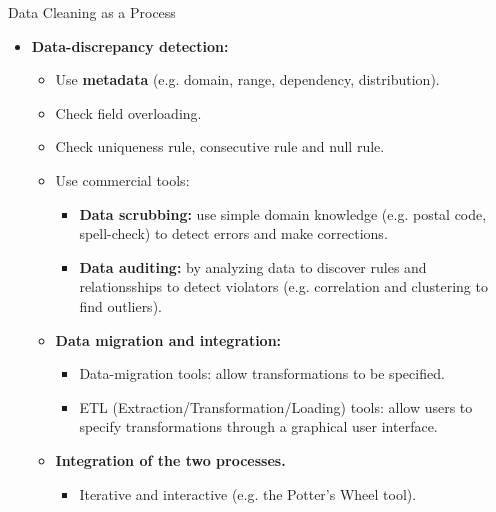 \begin{frame}{Data Cleaning as a Process}
	\begin{itemize}
		\item \textbf{Data-discrepancy detection:}
		\begin{itemize}
			\item Use \textbf{\color{airforceblue}metadata} (e.g. domain, 
			range, dependency, distribution).
			\item Check field overloading.
			\item Check uniqueness rule, consecutive rule and null rule.
			\item Use commercial tools:
			\begin{itemize}
				\item \textbf{\color{airforceblue}Data scrubbing:} use simple 
				domain knowledge (e.g. postal code, spell-check) to detect 
				errors and make corrections.
				\item \textbf{\color{airforceblue}Data auditing:} by analyzing 
				data to discover rules and relationsships to detect violators 
				(e.g. correlation and clustering to find outliers).
			\end{itemize}
			\item \textbf{Data migration and integration:}
			\begin{itemize}
				\item Data-migration tools: allow transformations to be 
				specified.
				\item ETL (Extraction/Transformation/Loading) tools: allow 
				users to specify transformations through a graphical user 
				interface.
			\end{itemize}
			\item \textbf{Integration of the two processes.}
			\begin{itemize}
				\item Iterative and interactive (e.g. the Potter's Wheel tool).
			\end{itemize}
		\end{itemize}
	\end{itemize}
\end{frame}